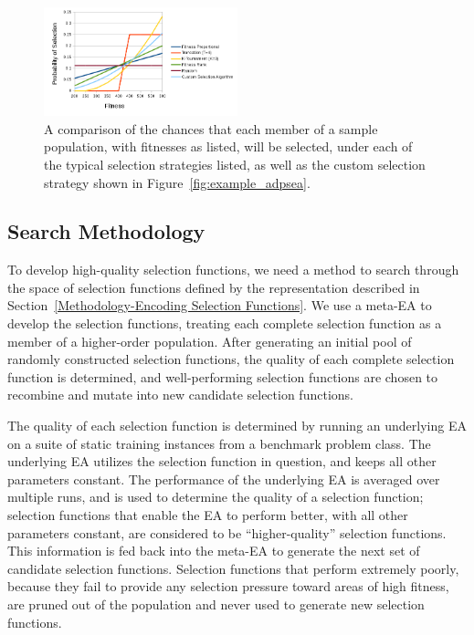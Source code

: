 \documentclass[sigconf]{acmart}
\begin{document}
\begin{figure}
	\centering
	\includegraphics[width=0.5\textwidth]{selection_chances}
	\caption{A comparison of the chances that each member of a sample population, with fitnesses as listed, will be selected, under each of the typical selection strategies listed, as well as the custom selection strategy shown in Figure~\ref{fig:example_adpsea}.}
	\label{fig:selection_chances}
\end{figure}

\subsection{Search Methodology}
\label{Methodology-Search Methodology}

To develop high-quality selection functions, we need a method to search through the space of selection functions defined by the representation described in Section~\ref{Methodology-Encoding Selection Functions}. We use a meta-EA to develop the selection functions, treating each complete selection function as a member of a higher-order population. After generating an initial pool of randomly constructed selection functions, the quality of each complete selection function is determined, and well-performing selection functions are chosen to recombine and mutate into new candidate selection functions. 

The quality of each selection function is determined by running an underlying EA on a suite of static training instances from a benchmark problem class. The underlying EA utilizes the selection function in question, and keeps all other parameters constant. The performance of the underlying EA is averaged over multiple runs, and is used to determine the quality of a selection function; selection functions that enable the EA to perform better, with all other parameters constant, are considered to be ``higher-quality'' selection functions. This information is fed back into the meta-EA to generate the next set of candidate selection functions. Selection functions that perform extremely poorly, because they fail to provide any selection pressure toward areas of high fitness, are pruned out of the population and never used to generate new selection functions. 
\end{document}
